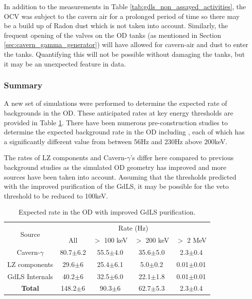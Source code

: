 \par
In addition to the measurements in Table \ref{tab:gdls_non_assayed_activities}, the OCV was subject to the cavern air for a prolonged period of time so there may be a build up of Radon dust which is not taken into account.
Similarly, the frequent opening of the valves on the OD tanks (as mentioned in Section \ref{sec:cavern_gamma_generator}) will have allowed for cavern-air and dust to enter the tanks.
Quantifying this will not be possible without damaging the tanks, but it may be an unexpected feature in data.


\subsubsection{Summary}
\par
A new set of simulations were performed to determine the expected rate of backgrounds in the OD.
These anticipated rates at key energy thresholds are provided in Table \ref{tab:od_expected_rates}.
There have been numerous pre-construction studies to determine the expected background rate in the OD including \cite{LZ_TechnicalDesignReview_ref,LZ_projected_sensitivity_paper_ref,sallyshaw_thesis_ref,scotthaselschwardt_thesis_ref,lz_od_taup_2019_ref}, each of which has a significantly different value from between 56Hz and 230Hz above 200keV.
\par
The rates of LZ components and Cavern-$\gamma$'s differ here compared to previous background studies as the simulated OD geometry has improved and more sources have been taken into account.
Assuming that the thresholds predicted with the improved purification of the GdLS, it may be possible for the veto threshold to be reduced to 100keV.

\begin{table}[!htbp]
    \centering
    \begin{tabular}{c|c|c|c|c} %
    \hline
    \multirow{2}{*}{Source} & \multicolumn{4}{c}{Rate (Hz)} \\
                            & All          & $>$ 100 keV   & $>$ 200 keV   & $>$ 2 MeV \\ \hline
    Cavern-$\gamma$         & 80.7$\pm$6.2 & 55.5$\pm$4.0  & 35.6$\pm$5.0  & 2.3$\pm$0.4     \\
    LZ components           & 29.6$\pm$6   & 25.4$\pm$6.1  & 5.0$\pm$0.2   & 0.01$\pm$0.01   \\
    GdLS Internals          & 40.2$\pm$6   & 32.5$\pm$6.0  & 22.1$\pm$1.8  & 0.01$\pm$0.01   \\ \hline
    \textbf{Total}          & 148.2$\pm$6  & 90.3$\pm$6    & 62.7$\pm$5.3  & 2.3$\pm$0.4      \\ \hline
    \end{tabular}
    \caption{Expected rate in the OD with improved GdLS purification.}
    \label{tab:od_expected_rates}
\end{table} 

